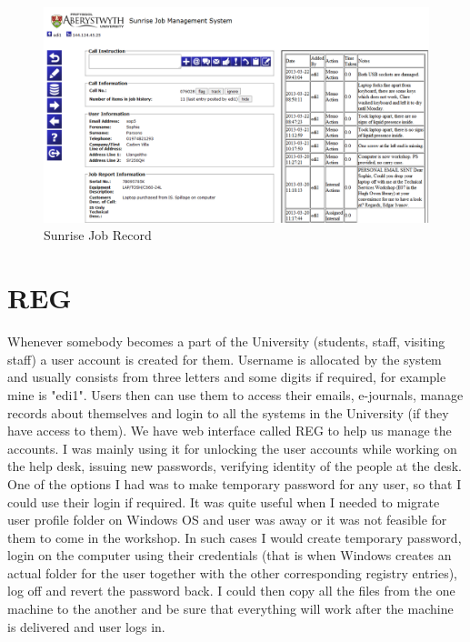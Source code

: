 \documentclass[10pt,a4paper,headinclude=true,twoside]{report}
\begin{document}
\begin{figure}[H]
\centering
\centerline{\includegraphics[scale=0.5]{./sunrise_job}}
\caption{Sunrise Job Record}
\label{fig:sunrise_job}
\end{figure}

\section{REG}
Whenever somebody becomes a part of the University (students, staff, visiting staff) a user account is created for them. Username is allocated by the system and usually consists from three letters and some digits if required, for example mine is "edi1". Users then can use them to access their emails, e-journals, manage records about themselves and login to all the systems in the University (if they have access to them). We have web interface called REG to help us manage the accounts. I was mainly using it for unlocking the user accounts while working on the help desk, issuing new passwords, verifying identity of the people at the desk. One of the options I had was to make temporary password for any user, so that I could use their login if required. It was quite useful when I needed to migrate user profile folder on Windows OS and user was away or it was not feasible for them to come in the workshop. In such cases I would create temporary password, login on the computer using their credentials (that is when Windows creates an actual folder for the user together with the other corresponding registry entries), log off and revert the password back. I could then copy all the files from the one machine to the another and be sure that everything will work after the machine is delivered and user logs in.
\end{document}
